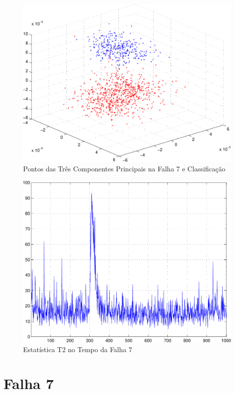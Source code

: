 \documentclass[journal]{IEEEtran}
\begin{document}
\begin{figure}[H]
	\centering
  \includegraphics[scale=0.6]{figs/fault7/pontos3D.pdf}
  \caption{Pontos das Três Componentes Principais na Falha 7 e Classificação}
	\label{fig:f7:3d}
\end{figure}

\begin{figure}[H]
	\centering
  \includegraphics[scale=0.6]{figs/fault7/T2_tempo.pdf}
  \caption{Estatística T2 no Tempo da Falha 7}
	\label{fig:f7:t2}
\end{figure}


\clearpage
\section*{Falha 7}
\end{document}
